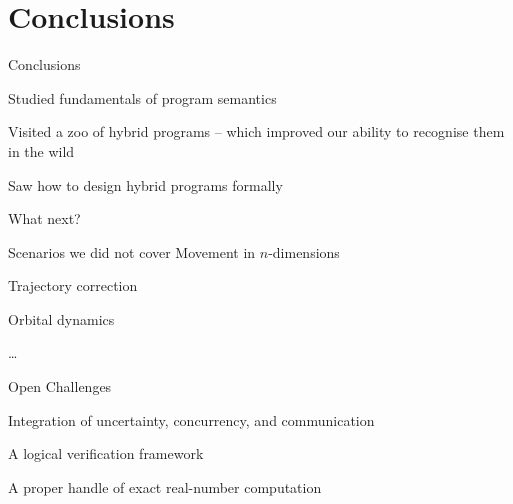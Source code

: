 \documentclass{beamer}
\begin{document}
\section{Conclusions}

\begin{frame}{Conclusions}

        Studied fundamentals of program semantics

        Visited a zoo of hybrid programs -- which improved our ability to
        recognise them in the wild

        Saw how to design hybrid programs \alert{formally}

        \vspace{0.5cm}
        \pause
        What next?
\end{frame}

\begin{frame}{Scenarios we did not cover}
        Movement in $n$-dimensions

        Trajectory correction

        Orbital dynamics

        \dots
\end{frame}

\begin{frame}{Open Challenges}

        Integration of uncertainty, concurrency, and communication

        A logical verification framework

        A proper handle of exact real-number computation
\end{frame}
\end{document}
